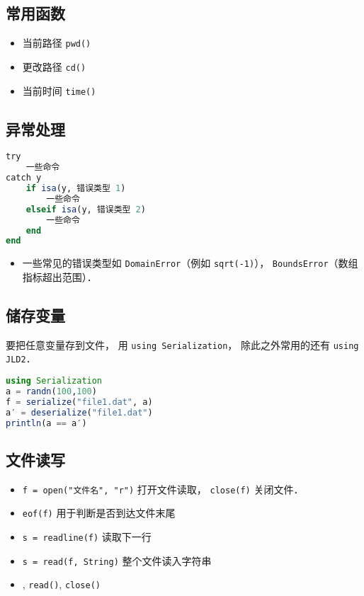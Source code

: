 \subsection{常用函数}
\begin{itemize}
\item 当前路径 \verb|pwd()|
\item 更改路径 \verb|cd()|
\item 当前时间 \verb|time()|
\end{itemize}

\subsection{异常处理}
\begin{lstlisting}[language=julia]
try
    一些命令
catch y
    if isa(y, 错误类型 1)
        一些命令
    elseif isa(y, 错误类型 2)
        一些命令
    end
end
\end{lstlisting}
\begin{itemize}
\item 一些常见的错误类型如 \verb|DomainError|（例如 \verb|sqrt(-1)|）， \verb|BoundsError|（数组指标超出范围）．
\end{itemize}


\subsection{储存变量}
要把任意变量存到文件， 用 \verb|using Serialization|， 除此之外常用的还有 \verb|using JLD2|．
\begin{lstlisting}[language=julia]
using Serialization
a = randn(100,100)
f = serialize("file1.dat", a)
a′ = deserialize("file1.dat")
println(a == a′)
\end{lstlisting}

\subsection{文件读写}
\begin{itemize}
\item \verb|f = open("文件名", "r")| 打开文件读取， \verb|close(f)| 关闭文件．
\item \verb|eof(f)| 用于判断是否到达文件末尾
\item \verb|s = readline(f)| 读取下一行
\item \verb|s = read(f, String)| 整个文件读入字符串
\item , \verb|read()|, \verb|close()|
\end{itemize}
